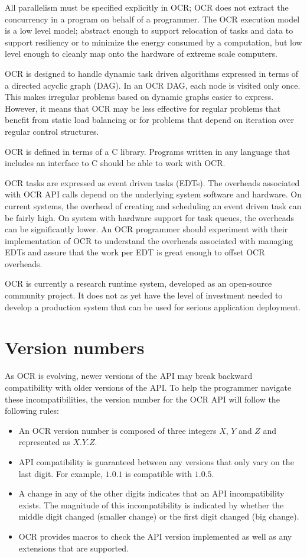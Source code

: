 All parallelism must be specified explicitly in OCR; OCR does not
extract the concurrency in a program on behalf of a programmer. The
OCR execution model is a low level model; abstract enough to support
relocation of tasks and data to support resiliency or to minimize the
energy consumed by a computation, but low level enough to cleanly map
onto the hardware of extreme scale computers.

OCR is designed to handle dynamic task driven algorithms expressed in
terms of a directed acyclic graph (DAG). In an OCR DAG, each node is
visited only once. This makes irregular problems based on dynamic
graphs easier to express. However, it means that OCR may be less
effective for regular problems that benefit from static load balancing
or for problems that depend on iteration over regular control
structures.

OCR is defined in terms of a C library. Programs written in any
language that includes an interface to C should be able to work with
OCR.

OCR tasks are expressed as event driven tasks (EDTs).
The overheads associated with OCR API calls depend on the underlying
system software and hardware. On current systems, the overhead of
creating and scheduling an event driven task can be fairly high.
On system with hardware support for task queues, the
overheads can be significantly lower. An OCR programmer should experiment with their
implementation of OCR to understand the overheads associated with managing EDTs and
assure that the work per EDT is great enough to offset OCR overheads.

OCR is currently a research runtime system, developed as an
open-source community project. It does not as yet have the level of
investment needed to develop a production system that can be used for
serious application deployment.
\section{Version numbers}
As OCR is evolving, newer versions of the API may break
backward compatibility with older versions of the API. To help the
programmer navigate these incompatibilities, the version number for
the OCR API will follow the following rules:
\begin{itemize}
\item{An OCR version number is composed of three integers $X$, $Y$ and
  $Z$ and represented as $X.Y.Z$.}
\item{API compatibility is guaranteed between any versions that only
  vary on the last digit. For example, $1.0.1$ is compatible with
  $1.0.5$.}
\item{A change in any of the other digits indicates that an API
  incompatibility exists. The magnitude of this incompatibility is
  indicated by whether the middle digit changed (smaller change) or
  the first digit changed (big change).}
\item{OCR provides macros to check the API version implemented as
  well as any extensions that are supported.}
\end{itemize}
